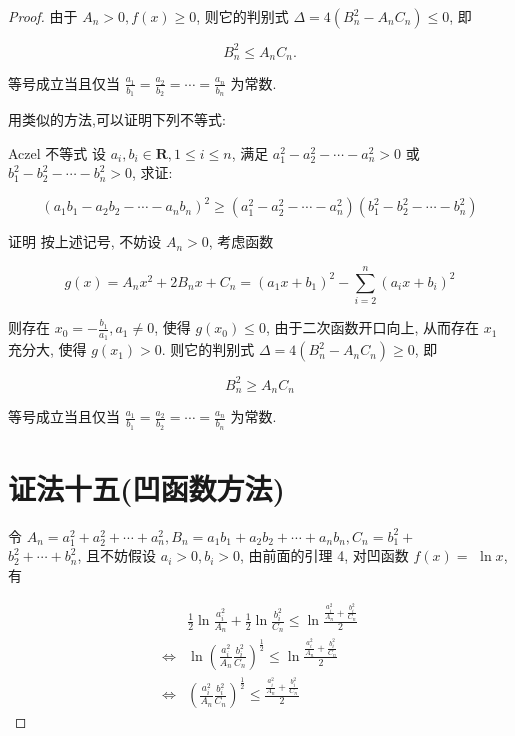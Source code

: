 \begin{proof}
	由于 $A_{n}>0, f(x) \geqslant 0$, 则它的判别式 $\Delta=4\left(B_{n}^{2}-A_{n} C_{n}\right) \leqslant 0$, 即
	
	$$
	B_{n}^{2} \leqslant A_{n} C_{n} .
	$$
	
	等号成立当且仅当 $\frac{a_{1}}{b_{1}}=\frac{a_{2}}{b_{2}}=\cdots=\frac{a_{n}}{b_{n}}$ 为常数.
	
	用类似的方法,可以证明下列不等式:
	
	Aczel 不等式 设 $a_{i}, b_{i} \in \mathbf{R}, 1 \leqslant i \leqslant n$, 满足 $a_{1}^{2}-a_{2}^{2}-\cdots-a_{n}^{2}>0$ 或 $b_{1}^{2}-b_{2}^{2}-\cdots-b_{n}^{2}>0$, 求证:
	
	$$
	\left(a_{1} b_{1}-a_{2} b_{2}-\cdots-a_{n} b_{n}\right)^{2} \geqslant\left(a_{1}^{2}-a_{2}^{2}-\cdots-a_{n}^{2}\right)\left(b_{1}^{2}-b_{2}^{2}-\cdots-b_{n}^{2}\right)
	$$
	
	证明 按上述记号, 不妨设 $A_{n}>0$, 考虑函数
	
	$$
	g(x)=A_{n} x^{2}+2 B_{n} x+C_{n}=\left(a_{1} x+b_{1}\right)^{2}-\sum_{i=2}^{n}\left(a_{i} x+b_{i}\right)^{2}
	$$
	
	则存在 $x_{0}=-\frac{b_{1}}{a_{1}}, a_{1} \neq 0$, 使得 $g\left(x_{0}\right) \leqslant 0$, 由于二次函数开口向上, 从而存在 $x_{1}$ 充分大, 使得 $g\left(x_{1}\right)>0$. 则它的判别式 $\Delta=4\left(B_{n}^{2}-A_{n} C_{n}\right) \geqslant 0$, 即
	
	$$
	B_{n}^{2} \geqslant A_{n} C_{n}
	$$
	
	等号成立当且仅当 $\frac{a_{1}}{b_{1}}=\frac{a_{2}}{b_{2}}=\cdots=\frac{a_{n}}{b_{n}}$ 为常数.
	
	\section*{证法十五(凹函数方法)}
	令 $A_{n}=a_{1}^{2}+a_{2}^{2}+\cdots+a_{n}^{2}, B_{n}=a_{1} b_{1}+a_{2} b_{2}+\cdots+a_{n} b_{n}, C_{n}=b_{1}^{2}+$\\
	$b_{2}^{2}+\cdots+b_{n}^{2}$, 且不妨假设 $a_{i}>0, b_{i}>0$, 由前面的引理 4, 对凹函数 $f(x)=$ $\ln x$, 有
	
	$$
	\begin{aligned}
	& \frac{1}{2} \ln \frac{a_{i}^{2}}{A_{n}}+\frac{1}{2} \ln \frac{b_{i}^{2}}{C_{n}} \leqslant \ln \frac{\frac{a_{i}^{2}}{A_{n}}+\frac{b_{i}^{2}}{C_{n}}}{2} \\
	\Leftrightarrow & \ln \left(\frac{a_{i}^{2}}{A_{n}} \frac{b_{i}^{2}}{C_{n}}\right)^{\frac{1}{2}} \leqslant \ln \frac{\frac{a_{i}^{2}}{A_{n}}+\frac{b_{i}^{2}}{C_{n}}}{2} \\
	\Leftrightarrow & \left(\frac{a_{i}^{2}}{A_{n}} \frac{b_{i}^{2}}{C_{n}}\right)^{\frac{1}{2}} \leqslant \frac{\frac{a_{i}^{2}}{A_{n}}+\frac{b_{i}^{2}}{C_{n}}}{2}
	\end{aligned}
	$$
	

\end{proof}
